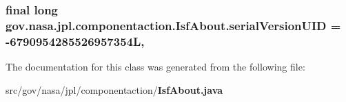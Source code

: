 \subsubsection[{serial\+Version\+U\+ID}]{\setlength{\rightskip}{0pt plus 5cm}final long gov.\+nasa.\+jpl.\+componentaction.\+Isf\+About.\+serial\+Version\+U\+ID = -\/6790954285526957354L\hspace{0.3cm}{\ttfamily [static]}, {\ttfamily [private]}}\label{classgov_1_1nasa_1_1jpl_1_1componentaction_1_1_isf_about_ae12e0ab260ed45d1924c6f549e8e0d8c}


The documentation for this class was generated from the following file\+:\begin{DoxyCompactItemize}
\item 
src/gov/nasa/jpl/componentaction/{\bf Isf\+About.\+java}\end{DoxyCompactItemize}
